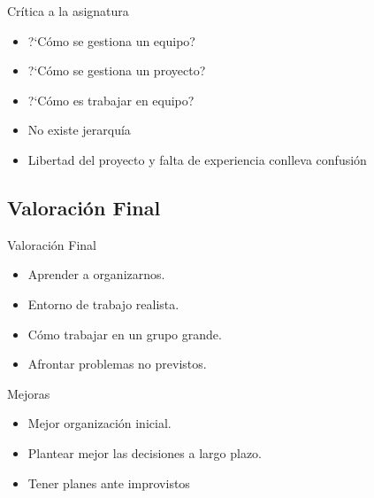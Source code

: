 \documentclass{beamer}
\begin{document}
\begin{frame}{Cr\'itica a la asignatura}
  \begin{itemize}
  \item { ?`C\'omo se gestiona un equipo?}
  \item { ?`C\'omo se gestiona un proyecto?}
  \item {?`C\'omo es trabajar en equipo?}
  \end{itemize}
  
    \begin{itemize}
    \item {No existe jerarqu\'ia}
    \item {Libertad del proyecto y falta de experiencia conlleva confusi\'on}
    \end{itemize}
    
\end{frame}

\subsection{Valoraci\'on Final}

\begin{frame}{Valoraci\'on Final}
	\begin{itemize}
 	 \item {
  		Aprender a organizarnos.
 	 }
 	 \item {
  		Entorno de trabajo realista.
 	 }
 	 \item {
		C\'omo trabajar en un grupo grande.
 	 }
 	 \item {
  		Afrontar problemas no previstos.
 	 }
 	 
  \end{itemize}
\end{frame}

\begin{frame}{Mejoras}
	\begin{itemize}
 	 \item {
  		Mejor organización inicial.
 	 }
 	 \item {
  		Plantear mejor las decisiones a largo plazo.
 	 }
 	 \item {
		Tener planes ante improvistos
 	 }
 	
  \end{itemize}
  	\begin{figure}[H]
  	\end{figure}
\end{frame}
\end{document}
